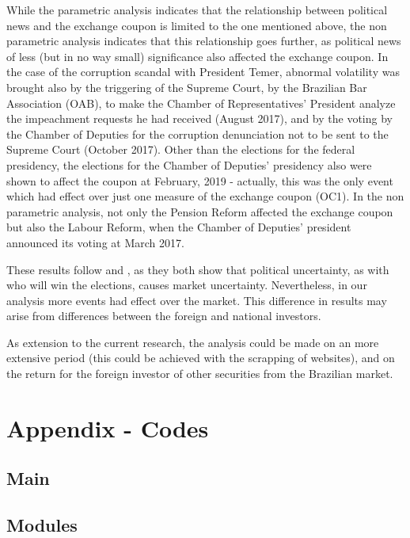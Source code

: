 \documentclass[cic,tc, english]{iiufrgs}
\begin{document}
    While the parametric analysis indicates that the relationship between political news and the exchange coupon is limited to the one mentioned above, the non parametric analysis indicates that this relationship goes further, as political news of less (but in no way small) significance also affected the exchange coupon. In the case of the corruption scandal with President Temer, abnormal volatility was brought also by the triggering of the Supreme Court, by the Brazilian Bar Association (OAB), to make the Chamber of Representatives' President analyze the impeachment requests he had received (August 2017), and by the voting by the Chamber of Deputies for the corruption denunciation not to be sent to the Supreme Court (October 2017). Other than the elections for the federal presidency, the elections for the Chamber of Deputies' presidency also were shown to affect the coupon at February, 2019 - actually, this was the only event which had effect over just one measure of the exchange coupon (OC1). In the non parametric analysis, not only the Pension Reform affected the exchange coupon but also the Labour Reform, when the Chamber of Deputies' president announced its voting at March 2017.

    These results follow \citet{smales2015} and \citet{marquessantos2016}, as they both show that political uncertainty, as with who will win the elections, causes market uncertainty. Nevertheless, in our analysis more events  had effect over the market. This difference in results may arise from differences between the foreign and national investors.

    As extension to the current research, the analysis could be made on an more extensive period (this could be achieved with the scrapping of websites), and on the return for the foreign investor of other securities from the Brazilian market.



    
\chapter{Appendix - Codes} \label{chapter_appendix}

\section{Main}

    

\section{Modules}
\end{document}
